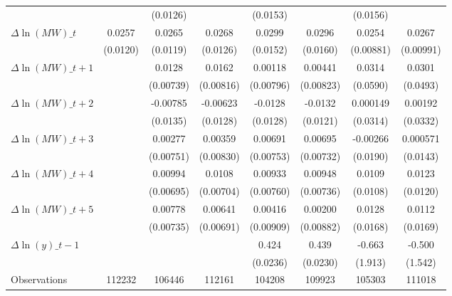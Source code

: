 {\begin{tabular}{l*{7}{c}}
          &                  & (0.0126)         &                  & (0.0153)         &                  & (0.0156)         &                  \\
[1em]
$\Delta \ln(MW)\_{t}$&   0.0257\sym{**} &   0.0265\sym{**} &   0.0268\sym{**} &   0.0299\sym{*}  &   0.0296\sym{*}  &   0.0254\sym{***}&   0.0267\sym{**} \\
          & (0.0120)         & (0.0119)         & (0.0126)         & (0.0152)         & (0.0160)         &(0.00881)         &(0.00991)         \\
[1em]
$\Delta \ln(MW)\_{t+1}$&                  &   0.0128\sym{*}  &   0.0162\sym{*}  &  0.00118         &  0.00441         &   0.0314         &   0.0301         \\
          &                  &(0.00739)         &(0.00816)         &(0.00796)         &(0.00823)         & (0.0590)         & (0.0493)         \\
[1em]
$\Delta \ln(MW)\_{t+2}$&                  & -0.00785         & -0.00623         &  -0.0128         &  -0.0132         & 0.000149         &  0.00192         \\
          &                  & (0.0135)         & (0.0128)         & (0.0128)         & (0.0121)         & (0.0314)         & (0.0332)         \\
[1em]
$\Delta \ln(MW)\_{t+3}$&                  &  0.00277         &  0.00359         &  0.00691         &  0.00695         & -0.00266         & 0.000571         \\
          &                  &(0.00751)         &(0.00830)         &(0.00753)         &(0.00732)         & (0.0190)         & (0.0143)         \\
[1em]
$\Delta \ln(MW)\_{t+4}$&                  &  0.00994         &   0.0108         &  0.00933         &  0.00948         &   0.0109         &   0.0123         \\
          &                  &(0.00695)         &(0.00704)         &(0.00760)         &(0.00736)         & (0.0108)         & (0.0120)         \\
[1em]
$\Delta \ln(MW)\_{t+5}$&                  &  0.00778         &  0.00641         &  0.00416         &  0.00200         &   0.0128         &   0.0112         \\
          &                  &(0.00735)         &(0.00691)         &(0.00909)         &(0.00882)         & (0.0168)         & (0.0169)         \\
[1em]
$\Delta \ln(y)\_{t-1}$&                  &                  &                  &    0.424\sym{***}&    0.439\sym{***}&   -0.663         &   -0.500         \\
          &                  &                  &                  & (0.0236)         & (0.0230)         &  (1.913)         &  (1.542)         \\
\hline
Observations&   112232         &   106446         &   112161         &   104208         &   109923         &   105303         &   111018         \\
\hline\hline
\end{tabular}
}
